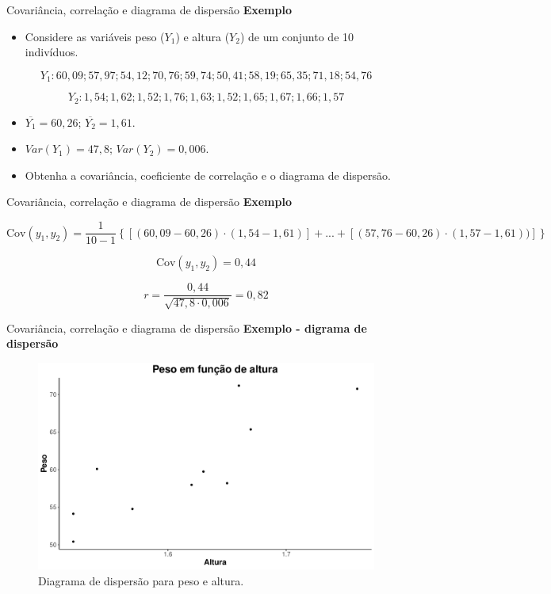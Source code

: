\documentclass[
  ignorenonframetext,
  serif,
  professionalfont,
  usenames,
  dvipsnames,
  aspectratio = 169]{beamer}
\providecommand{\tightlist}{%
  \setlength{\itemsep}{0pt}\setlength{\parskip}{0pt}}
\renewcommand{\tightlist}{%
  \setlength{\itemsep}{0\baselineskip}
  \setlength{\parskip}{0.25\baselineskip}
}
\begin{document}
\begin{frame}{Covariância, correlação e diagrama de dispersão}
\protect\hypertarget{covariuxe2ncia-correlauxe7uxe3o-e-diagrama-de-dispersuxe3o}{}
\textbf{Exemplo}

\begin{itemize}
\tightlist
\item
  Considere as variáveis peso (\(Y_1\)) e altura (\(Y_2\)) de um
  conjunto de 10 indivíduos.
\end{itemize}

\[Y_1: 60,09; 57,97; 54,12; 70,76; 59,74; 50,41; 58,19; 65,35; 71,18; 54,76\]

\[Y_2: 1,54; 1,62; 1,52; 1,76; 1,63; 1,52; 1,65; 1,67; 1,66; 1,57\]

\begin{itemize}
\item
  \(\overline{Y_1} = 60,26\); \(\overline{Y_2} = 1,61\).
\item
  \(Var(Y_1) = 47,8\); \(Var(Y_2) = 0,006\).
\item
  Obtenha a covariância, coeficiente de correlação e o diagrama de
  dispersão.
\end{itemize}
\end{frame}

\begin{frame}{Covariância, correlação e diagrama de dispersão}
\protect\hypertarget{covariuxe2ncia-correlauxe7uxe3o-e-diagrama-de-dispersuxe3o-1}{}
\textbf{Exemplo}

\[
\textrm{Cov}(y_1, y_2) = \frac{1}{10 - 1} \displaystyle \left \{ \left [ (60,09 - 60,26)\cdot (1,54 - 1,61) \right ] + ... + \left [ (57,76 - 60,26)\cdot (1,57 - 1,61)) \right ] \right \}
\]

\[
\textrm{Cov}(y_1, y_2) = 0,44
\]

\[
r  = \frac{0,44}{\sqrt{47,8\cdot 0,006}} = 0,82
\]
\end{frame}

\begin{frame}{Covariância, correlação e diagrama de dispersão}
\protect\hypertarget{covariuxe2ncia-correlauxe7uxe3o-e-diagrama-de-dispersuxe3o-2}{}
\textbf{Exemplo - digrama de dispersão}

\begin{figure}

{\centering \includegraphics[width=0.65\linewidth]{202-exploratoria-bivariada_files/figure-beamer/unnamed-chunk-11-1} 

}

\caption{Diagrama de dispersão para peso e altura.}\label{fig:unnamed-chunk-11}
\end{figure}
\end{frame}
\end{document}
